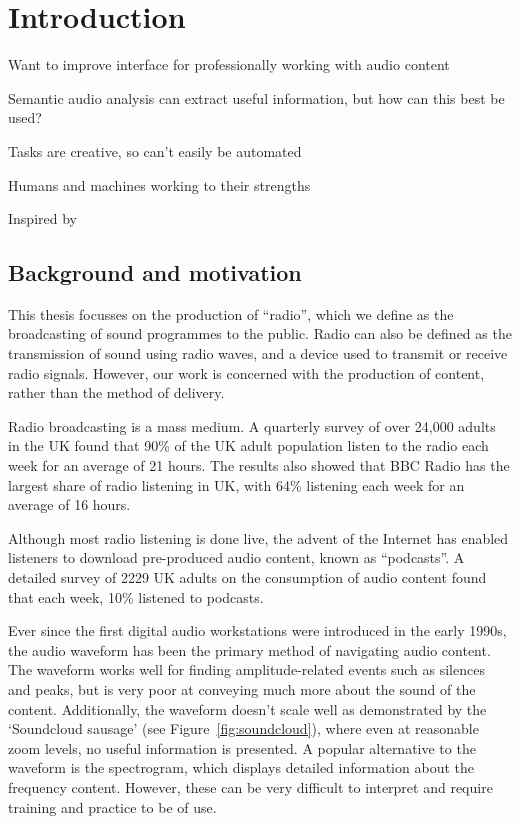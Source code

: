 \chapter{Introduction}\label{chp:intro}

Want to improve interface for professionally working with audio content

Semantic audio analysis can extract useful information, but how can this best be used?

Tasks are creative, so can't easily be automated

Humans and machines working to their strengths

Inspired by \citet{Loviscach2013}

\section{Background and motivation}\label{sec:intro-motivation}

This thesis focusses on the production of ``radio'', which we define as the broadcasting of sound programmes to the
public.  Radio can also be defined as the transmission of sound using radio waves, and a device used to transmit or
receive radio signals.  However, our work is concerned with the production of content, rather than the method of
delivery.

Radio broadcasting is a mass medium.  A quarterly survey of over 24,000 adults in the UK \citep{RAJAR2017a} found that
90\% of the UK adult population listen to the radio each week for an average of 21 hours. The results also showed that
BBC Radio has the largest share of radio listening in UK, with 64\% listening each week for an average of 16 hours.

Although most radio listening is done live, the advent of the Internet has enabled listeners to download pre-produced
audio content, known as ``podcasts''. A detailed survey of 2229 UK adults on the consumption of audio content
\citep{RAJAR2017} found that each week, 10\% listened to podcasts. 

Ever since the first digital audio workstations were introduced in the early
1990s, the audio waveform has been the primary method of navigating audio
content. The waveform works well for finding amplitude-related events such as
silences and peaks, but is very poor at conveying much more about the sound of
the content. Additionally, the waveform doesn't scale well as demonstrated by
the `Soundcloud sausage' (see Figure~\ref{fig:soundcloud}), where even at
reasonable zoom levels, no useful information is presented.  A popular
alternative to the waveform is the spectrogram, which displays detailed
information about the frequency content. However, these can be very difficult
to interpret and require training and practice to be of use.

